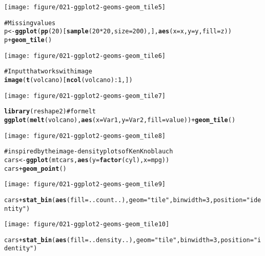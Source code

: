 \documentclass[a4paper,titlepage]{tufte-handout}\usepackage{graphicx, color}
\makeatletter
\def\maxwidth{ %
  \ifdim\Gin@nat@width>\linewidth
    \linewidth
  \else
    \Gin@nat@width
  \fi
}
\newcommand{\hlfunctioncall}[1]{\textcolor[rgb]{0.501960784313725,0,0.329411764705882}{\textbf{#1}}}%
\newcommand{\hlstring}[1]{\textcolor[rgb]{0.6,0.6,1}{#1}}%
\newcommand{\hlcomment}[1]{\textcolor[rgb]{0.180392156862745,0.6,0.341176470588235}{#1}}%
\newenvironment{kframe}{%
 \def\at@end@of@kframe{}%
 \ifinner\ifhmode%
  \def\at@end@of@kframe{\end{minipage}}%
  \begin{minipage}{\columnwidth}%
 \fi\fi%
 \def\FrameCommand##1{\hskip\@totalleftmargin \hskip-\fboxsep
 \colorbox{shadecolor}{##1}\hskip-\fboxsep
     \hskip-\linewidth \hskip-\@totalleftmargin \hskip\columnwidth}%
 \MakeFramed {\advance\hsize-\width
   \@totalleftmargin\z@ \linewidth\hsize
   \@setminipage}}%
 {\par\unskip\endMakeFramed%
 \at@end@of@kframe}
\newenvironment{knitrout}{}{} %
\makeatother
\begin{document}
\begin{knitrout}
\begin{kframe}
\begin{alltt}
\end{alltt}
\end{kframe}\texttt{[image: figure/021-ggplot2-geoms-geom\_tile5]} \begin{kframe}\begin{alltt}
\hlcomment{# Missing values}
p <- \hlfunctioncall{ggplot}(\hlfunctioncall{pp}(20)[\hlfunctioncall{sample}(20*20, size=200),], \hlfunctioncall{aes}(x=x,y=y,fill=z))
p + \hlfunctioncall{geom_tile}()
\end{alltt}
\end{kframe}\texttt{[image: figure/021-ggplot2-geoms-geom\_tile6]} \begin{kframe}\begin{alltt}
\hlcomment{# Input that works with image}
\hlfunctioncall{image}(\hlfunctioncall{t}(volcano)[\hlfunctioncall{ncol}(volcano):1,])
\end{alltt}
\end{kframe}\texttt{[image: figure/021-ggplot2-geoms-geom\_tile7]} \begin{kframe}\begin{alltt}
\hlfunctioncall{library}(reshape2) \hlcomment{# for melt}
\hlfunctioncall{ggplot}(\hlfunctioncall{melt}(volcano), \hlfunctioncall{aes}(x=Var1, y=Var2, fill=value)) + \hlfunctioncall{geom_tile}()
\end{alltt}
\end{kframe}\texttt{[image: figure/021-ggplot2-geoms-geom\_tile8]} \begin{kframe}\begin{alltt}
\hlcomment{# inspired by the image-density plots of Ken Knoblauch}
cars <- \hlfunctioncall{ggplot}(mtcars, \hlfunctioncall{aes}(y=\hlfunctioncall{factor}(cyl), x=mpg))
cars + \hlfunctioncall{geom_point}()
\end{alltt}
\end{kframe}\texttt{[image: figure/021-ggplot2-geoms-geom\_tile9]} \begin{kframe}\begin{alltt}
cars + \hlfunctioncall{stat_bin}(\hlfunctioncall{aes}(fill=..count..), geom=\hlstring{"tile"}, binwidth=3, position=\hlstring{"identity"})
\end{alltt}
\end{kframe}\texttt{[image: figure/021-ggplot2-geoms-geom\_tile10]} \begin{kframe}\begin{alltt}
cars + \hlfunctioncall{stat_bin}(\hlfunctioncall{aes}(fill=..density..), geom=\hlstring{"tile"}, binwidth=3, position=\hlstring{"identity"})

\end{alltt}
\end{kframe}
\end{knitrout}
\end{document}
